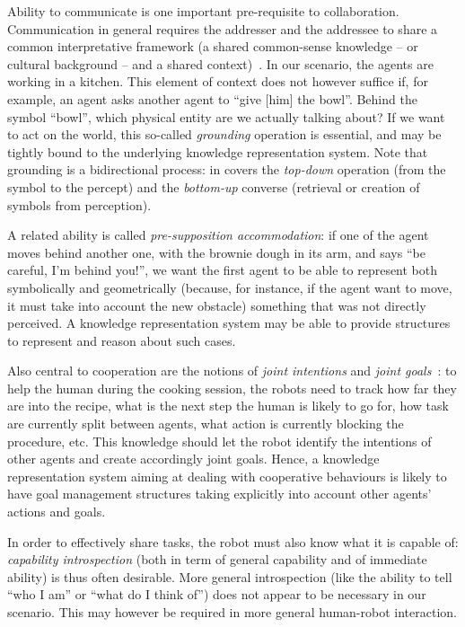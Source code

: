 Ability to communicate is one important pre-requisite to collaboration.
Communication in general requires the addresser and the addressee to share a
common interpretative framework (a shared common-sense knowledge -- or cultural
background -- and a shared context)~\cite{Jakobson1960}. In our scenario, the
agents are working in a kitchen. This element of context does not however
suffice if, for example, an agent asks another agent to ``give {[him]} the
bowl''. Behind the symbol ``bowl'', which physical entity are we actually
talking about? If we want to act on the world, this so-called \emph{grounding}
operation is essential, and may be tightly bound to the underlying knowledge
representation system. Note that grounding is a bidirectional process: in
covers the {\it top-down} operation (from the symbol to the percept) and the
{\it bottom-up} converse (retrieval or creation of symbols from perception).

A related ability is called \emph{pre-supposition accommodation}: if one of the
agent moves behind another one, with the brownie dough in its arm, and says
``be careful, I'm behind you!'', we want the first agent to be able to
represent both symbolically and geometrically (because, for instance, if the
agent want to move, it must take into account the new obstacle) something that
was not directly perceived. A knowledge representation system may be able to
provide structures to represent and reason about such cases.

Also central to cooperation are the notions of \emph{joint
intentions} and \emph{joint goals}~\cite{Tomasello2005, Bratman2009}: to help
the human during the cooking session, the robots need to track how far
they are into the recipe, what is the next step the human is likely to go for,
how task are currently split between agents, what action is currently
blocking the procedure, etc. This knowledge should let the robot identify the
intentions of other agents and create accordingly joint goals. Hence, a
knowledge representation system aiming at dealing with cooperative behaviours
is likely to have goal management structures taking explicitly into account
other agents' actions and goals.

In order to effectively share tasks, the robot must also know what it is
capable of: \emph{capability introspection} (both in term of general capability
and of immediate ability) is thus often desirable. More general introspection
(like the ability to tell ``who I am'' or ``what do I think of'') does not
appear to be necessary in our scenario. This may however be required in more
general human-robot interaction.

